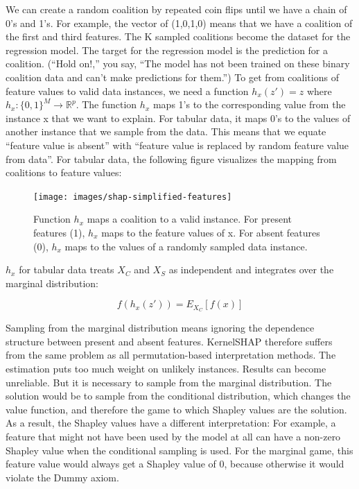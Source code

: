 \documentclass[
  12pt,
]{krantz}
\begin{document}
We can create a random coalition by repeated coin flips until we have a chain of 0's and 1's.
For example, the vector of (1,0,1,0) means that we have a coalition of the first and third features.
The K sampled coalitions become the dataset for the regression model.
The target for the regression model is the prediction for a coalition.
(``Hold on!,'' you say, ``The model has not been trained on these binary coalition data and can't make predictions for them.'')
To get from coalitions of feature values to valid data instances, we need a function \(h_x(z')=z\) where \(h_x:\{0,1\}^M\rightarrow\mathbb{R}^p\).
The function \(h_x\) maps 1's to the corresponding value from the instance x that we want to explain.
For tabular data, it maps 0's to the values of another instance that we sample from the data.
This means that we equate ``feature value is absent'' with ``feature value is replaced by random feature value from data''.
For tabular data, the following figure visualizes the mapping from coalitions to feature values:

\begin{figure}

{\centering \texttt{[image: images/shap-simplified-features]} 

}

\caption{Function $h_x$ maps a coalition to a valid instance. For present features (1), $h_x$ maps to the feature values of x. For absent features (0), $h_x$ maps to the values of a randomly sampled data instance.}\label{fig:shap-simplified-feature}
\end{figure}

\(h_x\) for tabular data treats \(X_C\) and \(X_S\) as independent and integrates over the marginal distribution:

\[f(h_x(z'))=E_{X_C}[f(x)]\]

Sampling from the marginal distribution means ignoring the dependence structure between present and absent features.
KernelSHAP therefore suffers from the same problem as all permutation-based interpretation methods.
The estimation puts too much weight on unlikely instances.
Results can become unreliable.
But it is necessary to sample from the marginal distribution.
The solution would be to sample from the conditional distribution, which changes the value function, and therefore the game to which Shapley values are the solution.
As a result, the Shapley values have a different interpretation:
For example, a feature that might not have been used by the model at all can have a non-zero Shapley value when the conditional sampling is used.
For the marginal game, this feature value would always get a Shapley value of 0, because otherwise it would violate the Dummy axiom.
\end{document}

